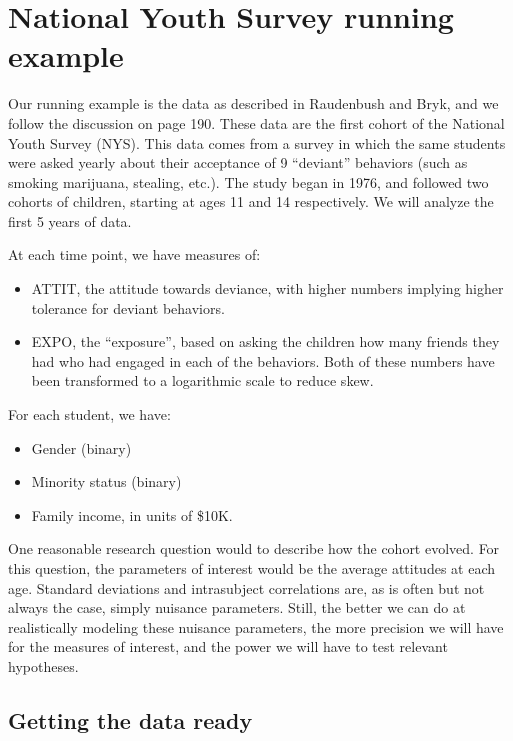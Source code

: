 \documentclass[
  letterpaper,
  DIV=11,
  numbers=noendperiod]{scrreprt}
\providecommand{\tightlist}{%
  \setlength{\itemsep}{0pt}\setlength{\parskip}{0pt}}\usepackage{longtable,booktabs,array}
\begin{document}
\hypertarget{national-youth-survey-running-example}{%
\section{National Youth Survey running
example}\label{national-youth-survey-running-example}}

Our running example is the data as described in Raudenbush and Bryk, and
we follow the discussion on page 190. These data are the first cohort of
the National Youth Survey (NYS). This data comes from a survey in which
the same students were asked yearly about their acceptance of 9
``deviant'' behaviors (such as smoking marijuana, stealing, etc.). The
study began in 1976, and followed two cohorts of children, starting at
ages 11 and 14 respectively. We will analyze the first 5 years of data.

At each time point, we have measures of:

\begin{itemize}
\tightlist
\item
  ATTIT, the attitude towards deviance, with higher numbers implying
  higher tolerance for deviant behaviors.
\item
  EXPO, the ``exposure'', based on asking the children how many friends
  they had who had engaged in each of the behaviors. Both of these
  numbers have been transformed to a logarithmic scale to reduce skew.
\end{itemize}

For each student, we have:

\begin{itemize}
\tightlist
\item
  Gender (binary)
\item
  Minority status (binary)
\item
  Family income, in units of \$10K.
\end{itemize}

One reasonable research question would to describe how the cohort
evolved. For this question, the parameters of interest would be the
average attitudes at each age. Standard deviations and intrasubject
correlations are, as is often but not always the case, simply nuisance
parameters. Still, the better we can do at realistically modeling these
nuisance parameters, the more precision we will have for the measures of
interest, and the power we will have to test relevant hypotheses.

\hypertarget{getting-the-data-ready-1}{%
\subsection{Getting the data ready}\label{getting-the-data-ready-1}}
\end{document}
